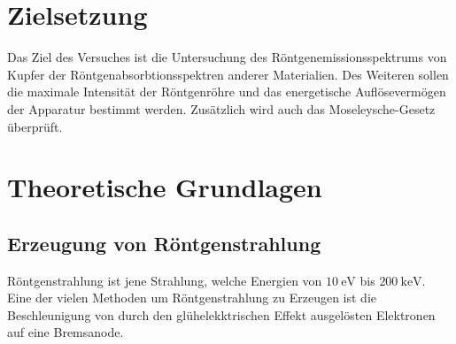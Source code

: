 \newpage
\section{Zielsetzung}
    Das Ziel des Versuches ist die Untersuchung des Röntgenemissionsspektrums  von Kupfer der
    Röntgenabsorbtionsspektren anderer Materialien. Des Weiteren sollen die maximale Intensität der Röntgenröhre und das energetische Auflösevermögen der Apparatur bestimmt werden.
    Zusätzlich wird auch das Moseleysche-Gesetz überprüft.

\section{Theoretische Grundlagen }

\subsection{Erzeugung von Röntgenstrahlung}

Röntgenstrahlung ist jene Strahlung, welche Energien von $\SI{10}{\eV}$ bis $\SI{200}{\kilo\eV}$.\\
Eine der vielen Methoden um Röntgenstrahlung zu Erzeugen ist die Beschleunigung von durch den glühelekktrischen Effekt ausgelösten Elektronen auf eine Bremsanode.\\


